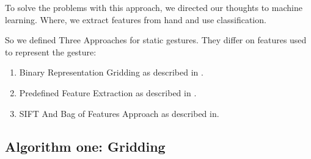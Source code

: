 To solve the problems with this approach, we directed our thoughts to machine learning. Where, we extract features from hand and use classification.
\bigskip

So we defined Three Approaches for static gestures. They differ on features used to represent the gesture:
\begin{enumerate}
\item Binary Representation Gridding as described in \cite{paper1sb}.
\item Predefined Feature Extraction as described in \cite{paper2sT}.
\item SIFT And Bag of Features Approach as described in\cite{dardas}.
\end{enumerate}
\bigskip


\subsection{Algorithm one: Gridding}

